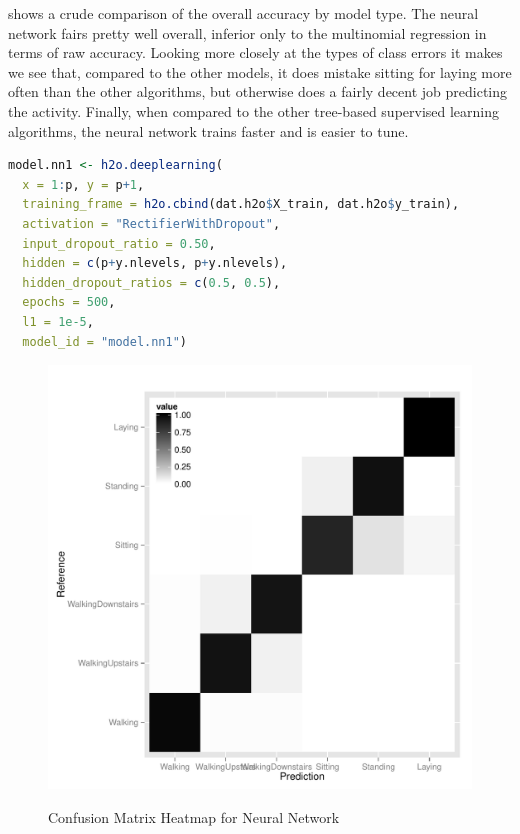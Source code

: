  shows a crude comparison of the overall accuracy by model type.  The neural network fairs pretty well overall, inferior only to the multinomial regression in terms of raw accuracy.  Looking more closely at the types of class errors it makes we see that, compared to the other models, it does mistake sitting for laying more often than the other algorithms, but otherwise does a fairly decent job predicting the activity.  Finally, when compared to the other tree-based supervised learning algorithms, the neural network trains faster and is easier to tune.



\begin{lstlisting}[float,label=lst:neural,caption=Final Deep Learning Configuration, language=R]
model.nn1 <- h2o.deeplearning(
  x = 1:p, y = p+1, 
  training_frame = h2o.cbind(dat.h2o$X_train, dat.h2o$y_train),
  activation = "RectifierWithDropout",
  input_dropout_ratio = 0.50,
  hidden = c(p+y.nlevels, p+y.nlevels),
  hidden_dropout_ratios = c(0.5, 0.5),
  epochs = 500,
  l1 = 1e-5,
  model_id = "model.nn1")
\end{lstlisting}




\begin{figure}[!htb]
  \centering
  \caption{Confusion Matrix Heatmap for Neural Network}
  \includegraphics[scale=.5]{heatmap_nn1.pdf}
  \label{fig:heatmap_nn1}
\end{figure}

